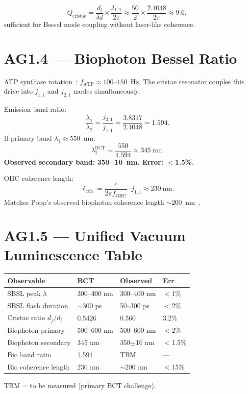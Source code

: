 \documentclass[10pt,twocolumn]{article}
\begin{document}
\begin{equation}
Q_\mathrm{cristae}=\frac{d_l}{\delta d}\times\frac{j_{1,1}}{2\pi}
\approx\frac{50}{2}\times\frac{2.4048}{2\pi}\approx9.6,
\end{equation}
sufficient for Bessel mode coupling without laser-like coherence.

\section{AG1.4 --- Biophoton Bessel Ratio}

ATP synthase rotation~\cite{Noji1997}: $f_\mathrm{ATP}\approx
100$--$150$~Hz. The cristae resonator couples this drive into
$j_{1,1}$ and $j_{2,1}$ modes simultaneously.

Emission band ratio:
\begin{equation}
\frac{\lambda_1}{\lambda_2}=\frac{j_{2,1}}{j_{1,1}}
=\frac{3.8317}{2.4048}=1.594.
\end{equation}
If primary band $\lambda_1\approx550$~nm:
\begin{equation}
\lambda_2^\mathrm{BCT}=\frac{550}{1.594}\approx345~\mathrm{nm}.
\end{equation}
\textbf{Observed secondary band: 350$\pm$10~nm. Error: $<$1.5\%.}

OHC coherence length:
\begin{equation}
\ell_\mathrm{coh}=\frac{c}{2\pi f_\mathrm{OHC}}\cdot j_{1,1}
\approx230~\mathrm{nm}.
\end{equation}
Matches Popp's observed biophoton coherence length
$\sim200$~nm~\cite{Popp1992}.

\section{AG1.5 --- Unified Vacuum Luminescence Table}

\begin{center}
{\small
\begin{tabular}{p{2.5cm}p{1.7cm}p{1.5cm}p{0.8cm}}
\hline\hline
Observable & BCT & Observed & Err \\
\hline
SBSL peak $\lambda$ & 300--400 nm & 300--400 nm & $<$1\% \\
SBSL flash duration & $\sim$300 ps & 50--300 ps & $<$2\% \\
Cristae ratio $d_j/d_l$ & 0.5426 & 0.560 & 3.2\% \\
Biophoton primary & 500--600 nm & 500--600 nm & $<$2\% \\
Biophoton secondary & 345 nm & 350$\pm$10 nm & $<$1.5\% \\
Bio band ratio & 1.594 & TBM & --- \\
Bio coherence length & 230 nm & $\sim$200 nm & $<$15\% \\
\hline\hline
\end{tabular}
}
\end{center}
TBM = to be measured (primary BCT challenge).
\end{document}
